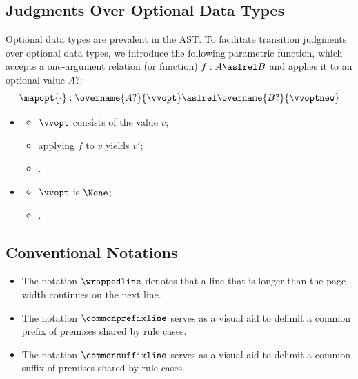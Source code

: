 \subsection{Judgments Over Optional Data Types}
\hypertarget{def-mapopt}{}
Optional data types are prevalent in the AST.
To facilitate transition judgments over optional data types,
we introduce the following parametric function,
which accepts a one-argument relation (or function) $f : A \aslrel B$
and applies it to an optional value $A?$:
\[
\mapopt{\cdot} : \overname{A?}{\vvopt} \aslrel \overname{B?}{\vvoptnew}
\]

\ProseParagraph
\OneApplies
\begin{itemize}
  \item {}
  \begin{itemize}
    \item $\vvopt$ consists of the value $v$;
    \item applying $f$ to $v$ yields $v'$;
    \item {}.
  \end{itemize}

  \item {}
  \begin{itemize}
    \item $\vvopt$ is $\None$;
    \item \Proseeqdef{$\vvoptnew$}{$\None$}.
  \end{itemize}
\end{itemize}

\FormallyParagraph
{}

\subsection{Conventional Notations}
\hypertarget{def-wrapline}{}
\begin{itemize}
\item
The notation $\wrappedline$ denotes that a line that is longer than the page width continues on the next line.

\hypertarget{def-commonprefixline}{}
\item The notation $\commonprefixline$ serves as a visual aid to delimit a common prefix of premises shared by rule cases.

\hypertarget{def-commonsuffixline}{}
\item The notation $\commonsuffixline$ serves as a visual aid to delimit a common suffix of premises shared by rule cases.
\end{itemize}

